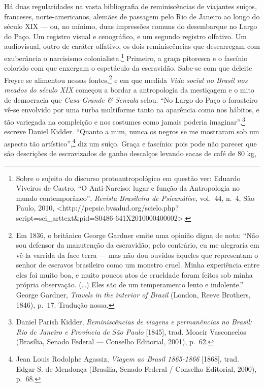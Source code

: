 Há duas regularidades na vasta bibliografia de reminiscências de
viajantes suíços, franceses, norte-americanos, alemães de passagem pelo
Rio de Janeiro ao longo do século XIX --- ou, no mínimo, duas impressões
comuns do desembarque no Largo do Paço. Um registro visual e
cenográfico, e um segundo registro olfativo. Um audiovisual, outro de
caráter olfativo, os dois reminiscências que descarregam com exuberância
o narcisismo colonialista.\footnote{Sobre o sujeito do discurso
  protoantropológico em questão ver: Eduardo Viveiros de Castro, ``O
  Anti-Narciso: lugar e função da Antropologia no mundo contemporâneo'',
  \textit{Revista Brasileira de Psicanálise}, vol.~44, n.~4, São Paulo,
  2010,
  \textless{}http://pepsic.bvsalud.org/scielo.php?script=sci\_arttext\&pid=S0486-641X2010000400002\textgreater{}.}
Primeiro, a graça pitoresca e o fascínio colorido com que enxergam o
espetáculo da escravidão. Sabe-se com que deleite Freyre se alimentou
nessas fontes,\footnote{Em 1836, o britânico George Gardner emite uma
  opinião digna de nota: ``Não sou defensor da manutenção da escravidão;
  pelo contrário, eu me alegraria em vê-la varrida da face terra --- mas
  não dou ouvidos àqueles que representam o senhor de escravos
  brasileiro como um monstro cruel. Minha experiência entre eles foi
  muito boa, e muito poucos atos de crueldade foram feitos sob minha
  própria observação. (\ldots{}) Eles são de um temperamento lento e
  indolente.'' George Gardner, \textit{Travels in the interior of Brazil}
  (London, Reeve Brothers, 1846), p.~17. Tradução nossa.} e em que
medida \textit{Vida social no Brasil nos meados do século XIX} começou a
bordar a antropologia da mestiçagem e o mito de democracia que
\textit{Casa-Grande \& Senzala} selou. ``No Largo do Paço o forasteiro
vê-se envolvido por uma turba multiforme tanto na aparência como nos
hábitos, e tão variegada na compleição e nos costumes como jamais
poderia imaginar'',\footnote{Daniel Parish Kidder, \textit{Reminiscências
  de viagens e permanências no Brasil: Rio de Janeiro e Província de São
  Paulo} {[}1845{]}, trad. Moacir Vasconcelos (Brasília, Senado Federal
  --- Conselho Editorial, 2001), p.~62.} escreve Daniel Kidder. ``Quanto
a mim, nunca os negros se me mostraram sob um aspecto tão
artístico'',\footnote{Jean Louis Rodolphe Agassiz, \textit{Viagem ao
  Brasil 1865-1866} {[}1868{]}, trad. Edgar S. de Mendonça (Brasília,
  Senado Federal / Conselho Editorial, 2000), p.~68.} diz um suíço.
Graça e fascínio: pois pode não parecer que são descrições de
escravizados de ganho descalços levando sacas de café de 80 kg,
